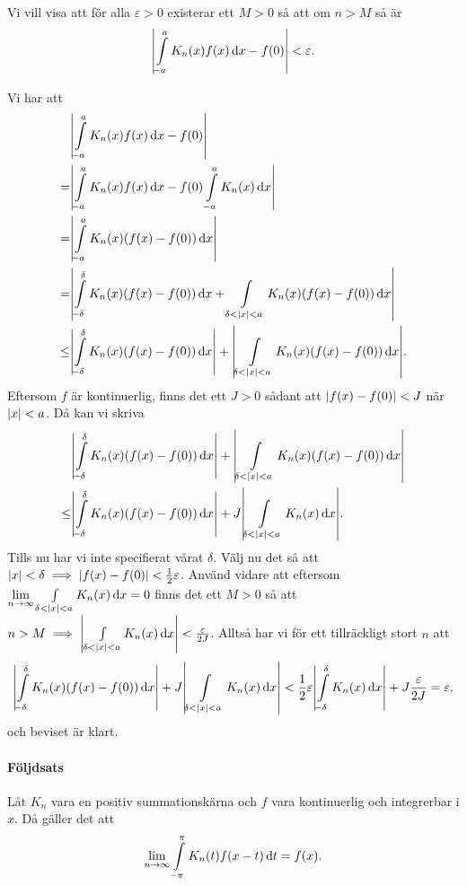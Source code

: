 \proof
Vi vill visa att för alla $\varepsilon > 0$ existerar ett $M > 0$ så att om $n > M$ så är
\begin{align*}
	\abs{\int\limits_{-a}^{a}K_{n}(x)f(x)\dd{x} - f(0)} < \varepsilon.
\end{align*}

Vi har att
\begin{align*}
         &\abs{\int\limits_{-a}^{a}K_{n}(x)f(x)\dd{x} - f(0)} \\
	=    &\abs{\int\limits_{-a}^{a}K_{n}(x)f(x)\dd{x} - f(0)\int\limits_{-a}^{a}K_{n}(x)\dd{x}} \\
	=    & \abs{\int\limits_{-a}^{a}K_{n}(x)(f(x) - f(0))\dd{x}} \\
	=    & \abs{\int\limits_{-\delta}^{\delta}K_{n}(x)(f(x) - f(0))\dd{x} + \int\limits_{\delta < \abs{x} < a}^{}K_{n}(x)(f(x) - f(0))\dd{x}} \\
	\leq & \abs{\int\limits_{-\delta}^{\delta}K_{n}(x)(f(x) - f(0))\dd{x}} + \abs{\int\limits_{\delta < \abs{x} < a}^{}K_{n}(x)(f(x) - f(0))\dd{x}}.
\end{align*}
Eftersom $f$ är kontinuerlig, finns det ett $J > 0$ sådant att $\abs{f(x) - f(0)} < J$ när $\abs{x} < a$. Då kan vi skriva
\begin{align*}
	     &\abs{\int\limits_{-\delta}^{\delta}K_{n}(x)(f(x) - f(0))\dd{x}} + \abs{\int\limits_{\delta < \abs{x} < a}^{}K_{n}(x)(f(x) - f(0))\dd{x}} \\
	\leq & \abs{\int\limits_{-\delta}^{\delta}K_{n}(x)(f(x) - f(0))\dd{x}} + J\abs{\int\limits_{\delta < \abs{x} < a}^{}K_{n}(x)\dd{x}}.
\end{align*}
Tills nu har vi inte specifierat vårat $\delta$. Välj nu det så att $\abs{x} < \delta\implies\abs{f(x) - f(0)} < \frac{1}{2}\varepsilon$. Använd vidare att eftersom $\lim\limits_{n\to\infty}\int\limits_{\delta < \abs{x} < a}^{}K_{n}(x)\dd{x} = 0$ finns det ett $M > 0$ så att $n > M\implies \abs{\int\limits_{\delta < \abs{x} < a}^{}K_{n}(x)\dd{x}} < \frac{\varepsilon}{2J}$. Alltså har vi för ett tillräckligt stort $n$ att
\begin{align*}
	\abs{\int\limits_{-\delta}^{\delta}K_{n}(x)(f(x) - f(0))\dd{x}} + J\abs{\int\limits_{\delta < \abs{x} < a}^{}K_{n}(x)\dd{x}} < \frac{1}{2}\varepsilon\abs{\int\limits_{-\delta}^{\delta}K_{n}(x)\dd{x}} + J\frac{\varepsilon}{2J} = \varepsilon,
\end{align*}
och beviset är klart.

\paragraph{Följdsats}
Låt $K_{n}$ vara en positiv summationskärna och $f$ vara kontinuerlig och integrerbar i $x$. Då gäller det att
\begin{align*}
	\lim\limits_{n\to\infty}\int\limits_{-\pi}^{\pi}K_{n}(t)f(x - t)\dd{t} = f(x).
\end{align*}

